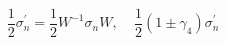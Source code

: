 \begin{equation}
\frac{1}{2} \sigma_{n}^{'} = \frac{1}{2}  W^{-1} \sigma_{n} W,~~~~~
\frac{1}{2} (1 \pm \gamma_{4}) \sigma_{n}^{'}
\end{equation}

